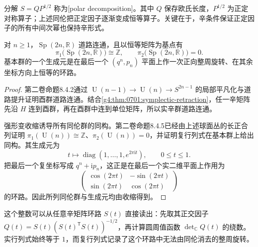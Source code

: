 分解 \(S=QP^{1/2}\) 称为[polar decomposition]。其中 \(Q\) 保存欧氏长度，\(P^{1/2}\) 为正定对称算子；上述同伦把正定因子逐渐变成恒等算子。关键在于，辛条件保证正定因子的所有中间次幂也保持辛形式。

\begin{corollary}\label{g4:cor:0701:symplectic-topology}
	对 \(n\ge1\)，\(\operatorname{Sp}(2n,\mathbb R)\) 道路连通，且以恒等矩阵为基点有
	\[
		\pi_1\bigl(\operatorname{Sp}(2n,\mathbb R)\bigr)\cong\mathbb Z,
		\qquad
		\pi_2\bigl(\operatorname{Sp}(2n,\mathbb R)\bigr)=0.
	\]
	基本群的一个生成元是在最后一个 \((q^n,p_n)\) 平面上作一次正向整周旋转、在其余坐标方向上恒等的环路。
\end{corollary}
\begin{proof}
	第二卷命题8.4.2通过 \(\operatorname{U}(n-1)\to\operatorname{U}(n)\to S^{2n-1}\) 的局部平凡化与道路提升证明酉群道路连通。结合\cref{g4:thm:0701:symplectic-retraction}，任一辛矩阵先沿 \(H\) 连到酉群，再在酉群中连到单位矩阵，所以实辛群道路连通。

	强形变收缩诱导所有同伦群的同构。第二卷命题8.4.5已经由上述球面丛的长正合列证明 \(\pi_1(\operatorname{U}(n))\cong\mathbb Z\)、\(\pi_2(\operatorname{U}(n))=0\)，并证明复行列式在基本群上给出同构。其生成元为
	\[
		t\longmapsto\operatorname{diag}(1,\ldots,1,e^{2\pi\mathrm{i}t}),
		\qquad 0\le t\le1.
	\]
	把最后一个复坐标写成 \(q^n+\mathrm{i}p_n\)，这正是在最后一个实二维平面上作用为
	\[
		\begin{pmatrix}
			\cos(2\pi t)&-\sin(2\pi t)\\
			\sin(2\pi t)&\cos(2\pi t)
		\end{pmatrix}
	\]
	的环路。因此所列同伦群与生成元均由收缩得到。
\end{proof}

这个整数可以从任意辛矩阵环路 \(S(t)\) 直接读出：先取其正交因子 \(Q(t)=S(t)(S(t)^{\mathsf T}S(t))^{-1/2}\)，再计算圆周值函数 \(\det_{\mathbb C}Q(t)\) 的绕数。实行列式始终等于 \(1\)，而复行列式记录了这个环路中无法由同伦消去的整周旋转。
